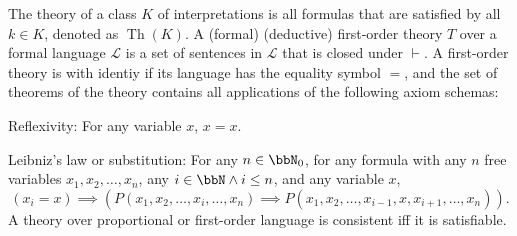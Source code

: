 \documentclass[a4paper,12pt]{article}
\begin{document}
The theory of a class $K$ of interpretations is all formulas that are satisfied by all $k\in K$, denoted as $\operatorname{Th}(K)$.
A (formal) (deductive) first-order theory $T$ over a formal language $\mathcal{L}$ is a set of sentences in $\mathcal{L}$ that is closed under $\vdash$.
A first-order theory is with identiy if its language has the equality symbol $=$, and the set of theorems of the theory contains all applications of the following axiom schemas:
\bit
\item Reflexivity: For any variable $x$, $x=x$.
\item Leibniz's law or substitution: For any $n\in\bbN_0$, for any formula with any $n$ free variables $x_1,x_2,\ldots,x_n$, any $i\in\bbN\land i\leq n$, and any variable $x$,
\[(x_i=x)\implies(P(x_1,x_2,\ldots,x_i,\ldots,x_n)\implies P(x_1,x_2,\ldots,x_{i-1},x,x_{i+1},\ldots,x_n)).\]
\eit
{}
A theory over proportional or first-order language is consistent iff it is satisfiable.
\end{document}
